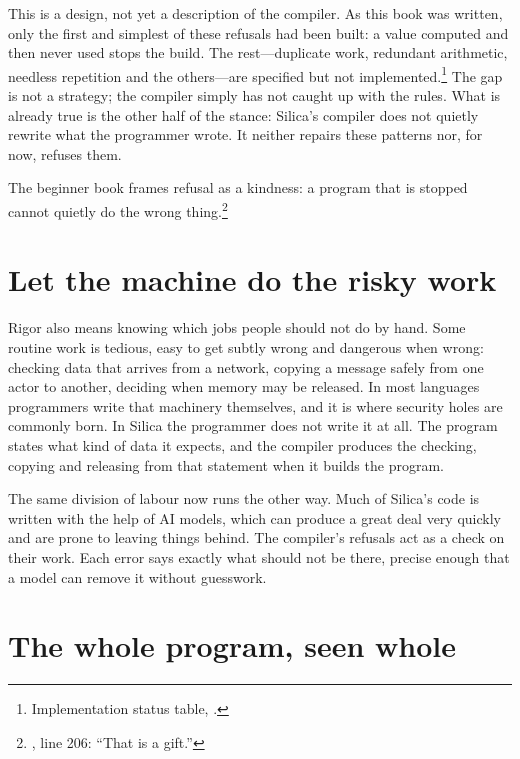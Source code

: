This is a design, not yet a description of the compiler. As this book was
written, only the first and simplest of these refusals had been built: a value
computed and then never used stops the build. The rest---duplicate work,
redundant arithmetic, needless repetition and the others---are specified but
not implemented.\footnote{Implementation status table,
.}
The gap is not a strategy; the compiler simply has not caught up with the
rules.
What is already true is the other half of the stance: Silica's compiler does
not quietly rewrite what the programmer wrote. It neither repairs these patterns
nor, for now, refuses them.

The beginner book frames refusal as a kindness: a program that is stopped cannot
quietly do the wrong thing.\footnote{,
line 206: ``That is a gift.''}


\section{Let the machine do the risky work}

Rigor also means knowing which jobs people should not do by hand. Some routine
work is tedious, easy to get subtly wrong and dangerous when wrong: checking
data that arrives from a network, copying a message safely from one actor to
another, deciding when memory may be released. In most languages programmers
write that machinery themselves, and it is where security holes are commonly
born. In Silica the programmer does not write it at all. The program states
what kind of data it expects, and the compiler produces the checking, copying
and releasing from that statement when it builds the program.

The same division of labour now runs the other way. Much of Silica's code is
written with the help of AI models, which can produce a great deal very quickly
and are prone to leaving things behind. The compiler's refusals act as a check
on their work. Each error says exactly what should not be there, precise enough
that a model can remove it without guesswork.

\section{The whole program, seen whole}

